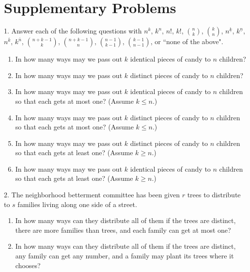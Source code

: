 \documentclass[10pt,]{book}
\theoremstyle{plain}
\theoremstyle{definition}
\theoremstyle{definition}
\numberwithin{equation}{chapter}
\begin{document}
\section[{Supplementary Problems}]{Supplementary Problems}\label{sec_distribution-suppprobs}
\begin{exerciselist}
\item[1.]\marginsymbol[-1em]{} \hypertarget{exercise-23}{}Answer each of the following questions with \(n^k\), \(k^n\), \(n!\), \(k!\), \(\binom{n}{k}\), \(\binom{k}{n}\), \(n^{\underline{k}}\), \(k^{\underline{n}}\), \(n^{\overline{k}}\), \(k^{\overline{n}}\), \(\binom{n+k-1}{k}\), \(\binom{n+k-1}{n}\), \(\binom{n-1}{k-1}\), \(\binom{k-1}{n-1}\), or ``none of the above". \leavevmode%
\begin{enumerate}[label=(\alph*)]
\item\hypertarget{li-38}{}In how many ways may we pass out \(k\) identical pieces of candy to \(n\) children?%
\item\hypertarget{li-39}{}In how many ways may we pass out \(k\) distinct pieces of candy to \(n\) children?%
\item\hypertarget{li-40}{}In how many ways may we pass out \(k\) identical pieces of candy to \(n\) children so that each gets at most one?  (Assume \(k\le n\).)%
\item\hypertarget{li-41}{}In how many ways may we pass out \(k\) distinct pieces of candy to \(n\) children so that each gets at most one?  (Assume \(k\le n\).)%
\item\hypertarget{li-42}{}In how many ways may we pass out \(k\) distinct pieces of candy to \(n\) children so that each gets at least one?  (Assume \(k\ge n\).)%
\item\hypertarget{li-43}{}In how many ways may we pass out \(k\) identical pieces of candy to \(n\) children so that each gets at least one?  (Assume \(k\ge n\).)%
\end{enumerate}
%
\par\smallskip
\item[2.]\marginsymbol[-1em]{} \hypertarget{exercise-24}{}The neighborhood betterment committee has been given \(r\) trees to distribute to \(s\) families living along one side of a street. \leavevmode%
\begin{enumerate}[label=(\alph*)]
\item\hypertarget{li-50}{}In how many ways can they distribute all of them if the trees are distinct, there are more families than trees, and each family can get at most one?%
\item\hypertarget{li-51}{}In how many ways can they distribute all of them if the trees are distinct, any family can get any number, and a family may plant its trees where it chooses?%

\end{enumerate}
\end{exerciselist}
\end{document}
